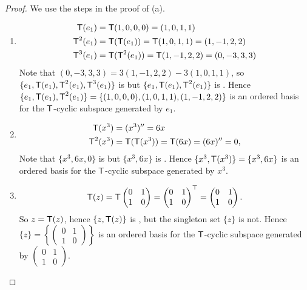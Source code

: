 \begin{proof}
We use the steps in the proof of (a).
\begin{enumerate}
\item
\begin{align*}
    \textsf{T}(e_1) & = \textsf{T}(1, 0, 0, 0) = (1, 0, 1, 1) \\
    \textsf{T}^2(e_1) & = \textsf{T}(\textsf{T}(e_1)) = \textsf{T}(1, 0, 1, 1) = (1, -1, 2, 2) \\
    \textsf{T}^3(e_1) & = \textsf{T}(\textsf{T}^2(e_1)) = \textsf{T}(1, -1, 2, 2) = (0, -3, 3, 3)
\end{align*}
\sloppy Note that \((0, -3, 3, 3) = 3(1, -1, 2, 2) - 3(1, 0, 1, 1)\), so \(\{ e_1, \textsf{T}(e_1), \textsf{T}^2(e_1), \textsf{T}^3(e_1) \}\) is \LDP{} but \(\{ e_1, \textsf{T}(e_1), \textsf{T}^2(e_1)\}\) is \LID{}.
Hence \(\{ e_1, \textsf{T}(e_1), \textsf{T}^2(e_1) \} = \{ (1, 0, 0, 0), (1, 0, 1, 1), (1, -1, 2, 2) \}\) is an ordered basis for the \(\textsf{T}\)-cyclic subspace generated by \(e_1\).

\item
\begin{align*}
    \textsf{T}(x^3) & = (x^3)'' = 6x \\
    \textsf{T}^2(x^3) & = \textsf{T}(\textsf{T}(x^3)) = \textsf{T}(6x) = (6x)'' = 0,
\end{align*}
Note that \(\{ x^3, 6x, 0 \}\) is \LDP{} but \(\{ x^3, 6x \}\) is \LID{}.
Hence \(\{ x^3, \textsf{T}(x^3) \} = \{ x^3, 6x \}\) is an ordered basis for the \(\textsf{T}\)-cyclic subspace generated by \(x^3\).

\item
\begin{align*}
    \textsf{T}(z) = \textsf{T} \begin{pmatrix} 0 & 1 \\ 1 & 0 \end{pmatrix} = \begin{pmatrix} 0 & 1 \\ 1 & 0 \end{pmatrix}^\top = \begin{pmatrix} 0 & 1 \\ 1 & 0 \end{pmatrix}.
\end{align*}
So \(z = \textsf{T}(z)\), hence \(\{ z, \textsf{T}(z) \}\) is \LDP{}, but the singleton set \(\{ z \}\) is not.
Hence \(\{ z \} = \left\{ \begin{pmatrix} 0 & 1 \\ 1 & 0 \end{pmatrix} \right\}\) is an ordered basis for the \(\textsf{T}\)-cyclic subspace generated by \(\begin{pmatrix} 0 & 1 \\ 1 & 0 \end{pmatrix}\).


\end{enumerate}
\end{proof}
